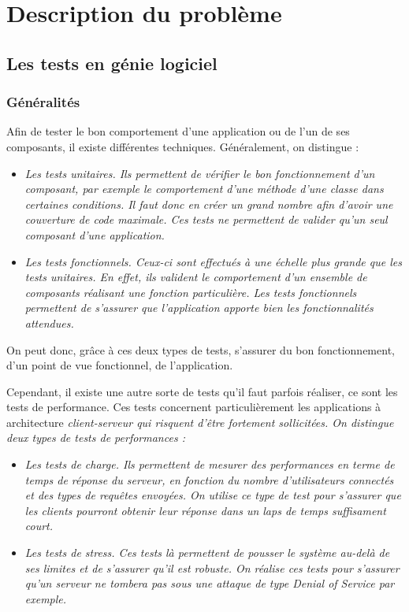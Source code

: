 \chapter{Description du problème}
\label{chap_test_charge}

\section{Les tests en génie logiciel}
\subsection{Généralités}
Afin de tester le bon comportement d'une application ou de l'un de ses composants, il existe différentes techniques. Généralement, on distingue :
\begin{itemize}
  \item \em{Les tests unitaires}. Ils permettent de vérifier le bon fonctionnement d'un composant, par exemple le comportement d'une méthode d'une classe dans certaines conditions. Il faut donc en créer un grand nombre afin d'avoir une couverture de code maximale. Ces tests ne permettent de valider qu'un seul composant d'une application.
  \item \em{Les tests fonctionnels}. Ceux-ci sont effectués à une échelle plus grande que les tests unitaires. En effet, ils valident le comportement d'un ensemble de composants réalisant une fonction particulière. Les tests fonctionnels permettent de s'assurer que l'application apporte bien les fonctionnalités attendues.
\end{itemize}
On peut donc, grâce à ces deux types de tests, s'assurer du bon fonctionnement, d'un point de vue fonctionnel, de l'application.

Cependant, il existe une autre sorte de tests qu'il faut parfois réaliser, ce sont les tests de performance. Ces tests concernent particulièrement les applications à architecture \em{client-serveur} qui risquent d'être fortement sollicitées. On distingue deux types de tests de performances : 
\begin{itemize}
  \item \em{Les tests de charge}. Ils permettent de mesurer des performances en terme de temps de réponse du serveur, en fonction du nombre d'utilisateurs connectés et des types de requêtes envoyées. On utilise ce type de test pour s'assurer que les clients pourront obtenir leur réponse dans un laps de temps suffisament court.
  \item \em{Les tests de stress}. Ces tests là permettent de pousser le système au-delà de ses limites et de s'assurer qu'il est robuste. On réalise ces tests pour s'assurer qu'un serveur ne tombera pas sous une attaque de type \em{Denial of Service} par exemple.
\end{itemize}

